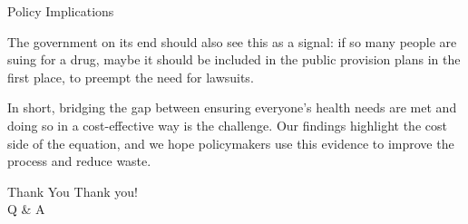 \documentclass[aspectratio=169]{beamer}
\begin{document}
\begin{frame}{Policy Implications}
{The government on its end should also see this as a signal: if so many people are suing for a drug, maybe it should be included in the public provision plans in the first place, to preempt the need for lawsuits.

In short, bridging the gap between ensuring everyone's health needs are met and doing so in a cost-effective way is the challenge. Our findings highlight the cost side of the equation, and we hope policymakers use this evidence to improve the process and reduce waste.}
\end{frame}


\begin{frame}{Thank You}
  \centering
  \Large{Thank you!\\[1ex]Q \& A}
\end{frame}
\end{document}
